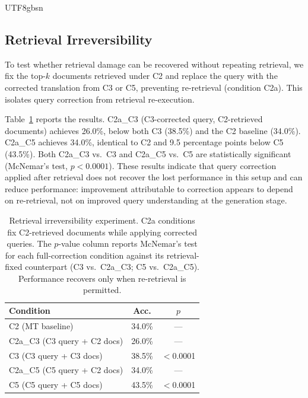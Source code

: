 \documentclass[11pt]{article}
\begin{document}
\begin{CJK}{UTF8}{gbsn}
\subsection{Retrieval Irreversibility}
\label{sec:irreversibility}
To test whether retrieval damage can be recovered without repeating retrieval, we fix the top-$k$ documents retrieved under C2 and replace the query with the corrected translation from C3 or C5, preventing re-retrieval (condition C2a). This isolates query correction from retrieval re-execution.

Table~\ref{tab:c2a} reports the results. C2a\_C3 (C3-corrected query, C2-retrieved documents) achieves 26.0\%, below both C3 (38.5\%) and the C2 baseline (34.0\%). C2a\_C5 achieves 34.0\%, identical to C2 and 9.5 percentage points below C5 (43.5\%). Both C2a\_C3 vs.\ C3 and C2a\_C5 vs.\ C5 are statistically significant (McNemar's test, $p < 0.0001$). These results indicate that query correction applied after retrieval does not recover the lost performance in this setup and can reduce performance: improvement attributable to correction appears to depend on re-retrieval, not on improved query understanding at the generation stage.

\begin{table}[ht]
\centering
\begin{tabular}{p{3.8cm}cc}
\toprule
\textbf{Condition} & \textbf{Acc.} & \textbf{$p$} \\
\midrule
C2 (MT baseline) & 34.0\% & --- \\
C2a\_C3 (C3 query + C2 docs) & 26.0\% & --- \\
C3 (C3 query + C3 docs) & 38.5\% & $<$0.0001 \\
\midrule
C2a\_C5 (C5 query + C2 docs) & 34.0\% & --- \\
C5 (C5 query + C5 docs) & 43.5\% & $<$0.0001 \\
\bottomrule
\end{tabular}
\caption{Retrieval irreversibility experiment. C2a conditions fix C2-retrieved documents while applying corrected queries. The $p$-value column reports McNemar's test for each full-correction condition against its retrieval-fixed counterpart (C3 vs.\ C2a\_C3; C5 vs.\ C2a\_C5). Performance recovers only when re-retrieval is permitted.}
\label{tab:c2a}
\end{table}


\end{CJK}
\end{document}
